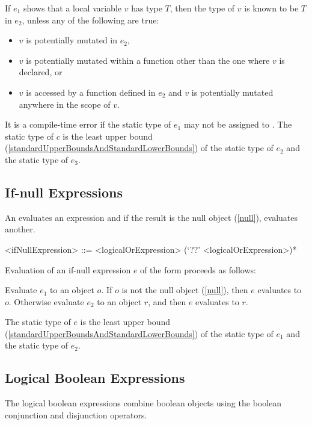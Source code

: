 \documentclass[makeidx]{article}
\begin{document}
{\LMHash{}%
If $e_1$ shows that a local variable $v$ has type $T$,
then the type of $v$ is known to be $T$ in $e_2$,
unless any of the following are true:

\begin{itemize}
\item $v$ is potentially mutated in $e_2$,
\item $v$ is potentially mutated within a function other
  than the one where $v$ is declared, or
\item $v$ is accessed by a function defined in $e_2$ and
  $v$ is potentially mutated anywhere in the scope of $v$.
\end{itemize}

\LMHash{}%
It is a compile-time error if
the static type of $e_1$ may not be assigned to .
The static type of $c$ is the least upper bound
(\ref{standardUpperBoundsAndStandardLowerBounds})
of the static type of $e_2$ and the static type of $e_3$.


\subsection{If-null Expressions}

\LMHash{}%
An  evaluates an expression and
if the result is the null object (\ref{null}), evaluates another.

\begin{grammar}
<ifNullExpression> ::= <logicalOrExpression> (`??' <logicalOrExpression>)*
\end{grammar}

\LMHash{}%
Evaluation of an if-null expression $e$ of the form 
proceeds as follows:

\LMHash{}%
Evaluate $e_1$ to an object $o$.
If $o$ is not the null object (\ref{null}), then $e$ evaluates to $o$.
Otherwise evaluate $e_2$ to an object $r$,
and then $e$ evaluates to $r$.

\LMHash{}%
The static type of $e$ is the least upper bound
(\ref{standardUpperBoundsAndStandardLowerBounds})
of the static type of $e_1$ and the static type of $e_2$.


\subsection{Logical Boolean Expressions}

\LMHash{}%
The logical boolean expressions combine boolean objects using
the boolean conjunction and disjunction operators.

}
\end{document}
